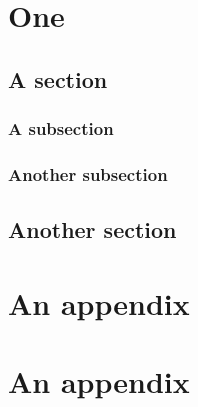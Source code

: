 \chapter{One}
\section{A section}
\lipsum \cite{Chomsky1986,Chomsky1995}
\subsection{A subsection}
\lipsum[1]
\subsection{Another subsection}
\lipsum[2]
\section{Another section}
\lipsum[3]



\begin{appendices}
  \chapter{An appendix}
  \chapter{An appendix}
\end{appendices}

